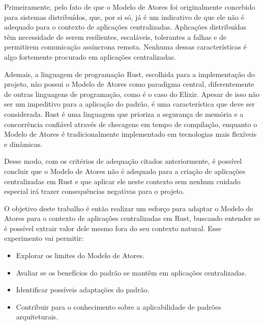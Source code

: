 Primeiramente, pelo fato de que o Modelo de Atores foi originalmente concebido para sistemas distribuídos, que, por si só, já é um indicativo de que ele não é adequado para o contexto de aplicações centralizadas. Aplicações distribuídas têm necessidade de serem resilientes, escaláveis, tolerantes a falhas e de permitirem comunicação assíncrona remota. Nenhuma dessas características é algo fortemente procurado em aplicações centralizadas.

Ademais, a linguagem de programação Rust, escolhida para a implementação do projeto, não possui o Modelo de Atores como paradigma central, diferentemente de outras linguagens de programação, como é o caso do Elixir. Apesar de isso não ser um impeditivo para a aplicação do padrão, é uma característica que deve ser considerada. Rust é uma linguagem que prioriza a segurança de memória e a concorrência confiável através de checagens em tempo de compilação, enquanto o Modelo de Atores é tradicionalmente implementado em tecnologias mais flexíveis e dinâmicas.

Desse modo, com os critérios de adequação citados anteriormente, é possível concluir que o Modelo de Atores não é adequado para a criação de aplicações centralizadas em Rust e que aplicar ele neste contexto sem nenhum cuidado especial irá trazer consequências negativas para o projeto.

O objetivo deste trabalho é então realizar um esforço para adaptar o Modelo de Atores para o contexto de aplicações centralizadas em Rust, buscando entender se é possível extrair valor dele mesmo fora do seu contexto natural. Esse experimento vai permitir:

\begin{itemize}
    \item Explorar os limites do Modelo de Atores.
    \item Avaliar se os benefícios do padrão se mantêm em aplicações centralizadas.
    \item Identificar possíveis adaptações do padrão.
    \item Contribuir para o conhecimento sobre a aplicabilidade de padrões arquiteturais.
\end{itemize}

